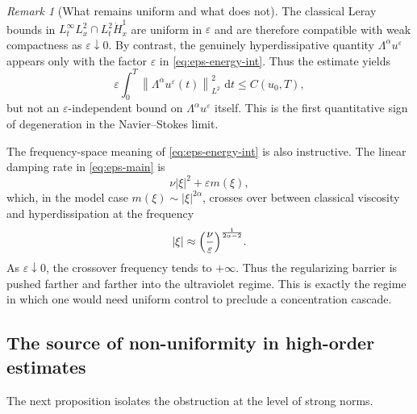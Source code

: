 \documentclass[11pt]{article}
\theoremstyle{definition}
\theoremstyle{remark}
\newtheorem{remark}[theorem]{Remark}
\newcommand{\dd}{\,\mathrm{d}}
\newcommand{\norm}[1]{\left\lVert #1\right\rVert}
\begin{document}
\begin{remark}[What remains uniform and what does not]
The classical Leray bounds in $L^\infty_tL^2_x\cap L^2_t\dot H^1_x$ are uniform in $\varepsilon$ and are therefore compatible with weak compactness as $\varepsilon\downarrow0$. By contrast, the genuinely hyperdissipative quantity $\Lambda^\alpha u^\varepsilon$ appears only with the factor $\varepsilon$ in \eqref{eq:eps-energy-int}. Thus the estimate yields
\begin{equation}\label{eq:eps-alpha-weighted}
\varepsilon\int_0^T\norm{\Lambda^\alpha u^\varepsilon(t)}_{L^2}^2\,\dd t\le C(u_0,T),
\end{equation}
but not an $\varepsilon$-independent bound on $\Lambda^\alpha u^\varepsilon$ itself. This is the first quantitative sign of degeneration in the Navier--Stokes limit.
\end{remark}

The frequency-space meaning of \eqref{eq:eps-energy-int} is also instructive. The linear damping rate in \eqref{eq:eps-main} is
\begin{equation}\label{eq:linear-rate-eps}
\nu|\xi|^2 + \varepsilon m(\xi),
\end{equation}
which, in the model case $m(\xi)\sim |\xi|^{2\alpha}$, crosses over between classical viscosity and hyperdissipation at the frequency
\begin{equation}\label{eq:crossover}
|\xi|\approx \Bigl(\frac{\nu}{\varepsilon}\Bigr)^{\frac{1}{2\alpha-2}}.
\end{equation}
As $\varepsilon\downarrow0$, the crossover frequency tends to $+\infty$. Thus the regularizing barrier is pushed farther and farther into the ultraviolet regime. This is exactly the regime in which one would need uniform control to preclude a concentration cascade.

\subsection{The source of non-uniformity in high-order estimates}

The next proposition isolates the obstruction at the level of strong norms.
\end{document}

